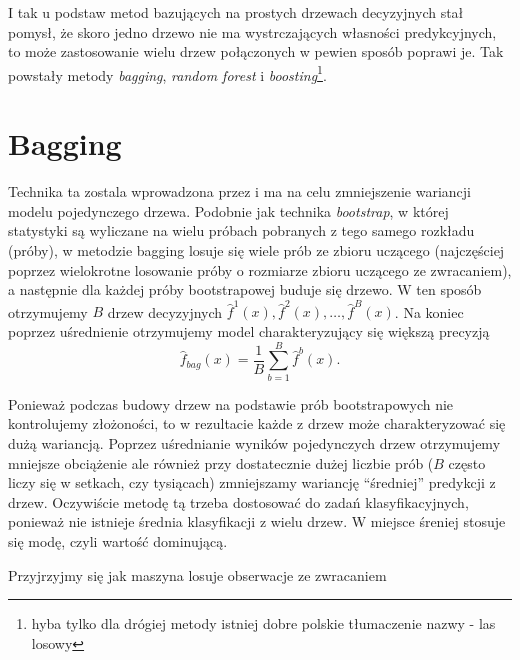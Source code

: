 \documentclass[]{book}
\let\rmarkdownfootnote\footnote%
\def\footnote{\protect\rmarkdownfootnote}
\theoremstyle{plain}
\theoremstyle{definition}
\begin{document}
I tak u podstaw metod bazujących na prostych drzewach decyzyjnych stał pomysł, że skoro jedno drzewo nie ma wystrczających własności predykcyjnych, to może zastosowanie wielu drzew połączonych w pewien sposób poprawi je. Tak powstały metody \emph{bagging}, \emph{random forest} i \emph{boosting}\footnote{hyba tylko dla drógiej metody istniej dobre polskie tłumaczenie nazwy - las losowy}.

\hypertarget{bagging}{%
\section{Bagging}\label{bagging}}

Technika ta zostala wprowadzona przez \citet{Breiman1996} i ma na celu zmniejszenie wariancji modelu pojedynczego drzewa. Podobnie jak technika \emph{bootstrap}, w której statystyki są wyliczane na wielu próbach pobranych z tego samego rozkładu (próby), w metodzie bagging losuje się wiele prób ze zbioru uczącego (najczęściej poprzez wielokrotne losowanie próby o rozmiarze zbioru uczącego ze zwracaniem), a następnie dla każdej próby bootstrapowej buduje się drzewo. W ten sposób otrzymujemy \(B\) drzew decyzyjnych \(\hat{f}^1(x), \hat{f}^2(x),\ldots, \hat{f}^B(x)\). Na koniec poprzez uśrednienie otrzymujemy model charakteryzujący się większą precyzją
\begin{equation}
    \hat{f}_{bag}(x)=\frac1B\sum_{b=1}^B\hat{f}^b(x).
\end{equation}

Ponieważ podczas budowy drzew na podstawie prób bootstrapowych nie kontrolujemy złożoności, to w rezultacie każde z drzew może charakteryzować się dużą wariancją. Poprzez uśrednianie wyników pojedynczych drzew otrzymujemy mniejsze obciążenie ale również przy dostatecznie dużej liczbie prób (\(B\) często liczy się w setkach, czy tysiącach) zmniejszamy wariancję ``średniej'' predykcji z drzew. Oczywiście metodę tą trzeba dostosować do zadań klasyfikacyjnych, ponieważ nie istnieje średnia klasyfikacji z wielu drzew. W miejsce śreniej stosuje się modę, czyli wartość dominującą.

Przyjrzyjmy się jak maszyna losuje obserwacje ze zwracaniem
\end{document}

